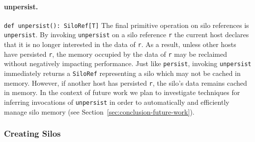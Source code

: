 \documentclass{jfp1}
\begin{document}



\paragraph{unpersist.}%
%
\texttt{def unpersist(): SiloRef[T]} \newline
%
The final primitive operation on silo references is
\verb|unpersist|. By invoking \verb|unpersist| on a silo reference
\verb|r| the current host declares that it is no longer interested in
the data of \verb|r|. As a result, unless other hosts have persisted
\verb|r|, the memory occupied by the data of \verb|r| may be reclaimed
without negatively impacting performance. Just like \verb|persist|,
invoking \verb|unpersist| immediately returns a \verb|SiloRef|
representing a silo which may not be cached in memory. However, if
another host has persisted \verb|r|, the silo's data remains cached in
memory. In the context of future work we plan to investigate
techniques for inferring invocations of \verb|unpersist| in order to
automatically and efficiently manage silo memory (see
Section~\ref{sec:conclusion-future-work}).

\subsubsection{Creating Silos}
\label{sec:creating-silos}
\end{document}
